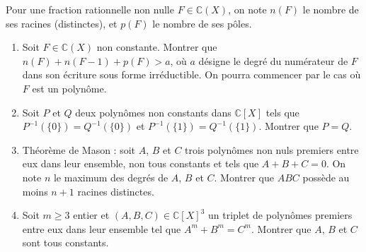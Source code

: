 \documentclass[french]{book}
\newcommand{\C}{\mathbb{C}}
\newcommand{\inv}{^{-1}}
\theoremstyle{definition}
\theoremstyle{remark}
\begin{document}
\begin{exo}[3]{}
	Pour une fraction rationnelle non nulle $F\in\C(X)$, on note $n(F)$ le nombre de ses racines (distinctes), et $p(F)$ le nombre de ses pôles.
	\begin{enumerate}
		\item Soit $F\in\C(X)$ non constante. Montrer que $n(F)+n(F-1)+p(F)>a$, où $a$ désigne le degré du numérateur de $F$ dans son écriture sous forme irréductible. On pourra commencer par le cas où $F$ est un polynôme.
		\item Soit $P$ et $Q$ deux polynômes non constants dans $\C[X]$ tels que $P\inv(\{0\})=Q\inv(\{0\})$ et $P\inv(\{1\})=Q\inv(\{1\})$. Montrer que $P=Q$.
		\item Théorème de Mason : soit $A$, $B$ et $C$ trois polynômes non nuls premiers entre eux dans leur ensemble, non tous constants et tels que $A+B+C=0$. On note $n$ le maximum des degrés de $A$, $B$ et $C$. Montrer que $ABC$ possède au moins $n+1$ racines distinctes.
		\item Soit $m\geqslant 3$ entier et $(A,B,C)\in\C[X]^3$ un triplet de polynômes premiers entre eux dans leur ensemble tel que $A^m+B^m=C^m$. Montrer que $A$, $B$ et $C$ sont tous constants.
	\end{enumerate}
\end{exo}
\end{document}
